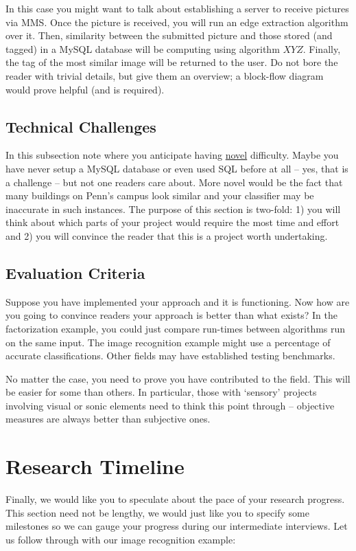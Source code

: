 \documentclass{sig-alternate}
\begin{document}
In this case you might want to talk about establishing a server to
receive pictures via MMS. Once the picture is received, you will run
an edge extraction algorithm over it. Then, similarity between the
submitted picture and those stored (and tagged) in a MySQL database
will be computing using algorithm $XYZ$. Finally, the tag of the most
similar image will be returned to the user. Do not bore the reader
with trivial details, but give them an overview; a block-flow diagram
would prove helpful (and is required).

\subsection{Technical Challenges}
\label{subsec:tech_challenges}
In this subsection note where you anticipate having \underline{novel}
difficulty. Maybe you have never setup a MySQL database or even used
SQL before at all -- yes, that is a challenge -- but not one readers
care about. More novel would be the fact that many buildings on Penn's
campus look similar and your classifier may be inaccurate in such
instances. The purpose of this section is two-fold: 1) you will think
about which parts of your project would require the most time and
effort and 2) you will convince the reader that this is a project
worth undertaking.

\subsection{Evaluation Criteria}
\label{subsec:eval_criteria}
Suppose you have implemented your approach and it is functioning. Now
how are you going to convince readers your approach is better than
what exists? In the factorization example, you could just compare
run-times between algorithms run on the same input. The image
recognition example might use a percentage of accurate
classifications. Other fields may have established testing benchmarks.

No matter the case, you need to prove you have contributed to the
field. This will be easier for some than others. In particular, those
with `sensory' projects involving visual or sonic elements need to
think this point through -- objective measures are always better than
subjective ones.

\section{Research Timeline}
\label{sec:research_timeline}
Finally, we would like you to speculate about the pace of your
research progress. This section need not be lengthy, we would just
like you to specify some milestones so we can gauge your progress
during our intermediate interviews. Let us follow through with our
image recognition example:
\end{document}
